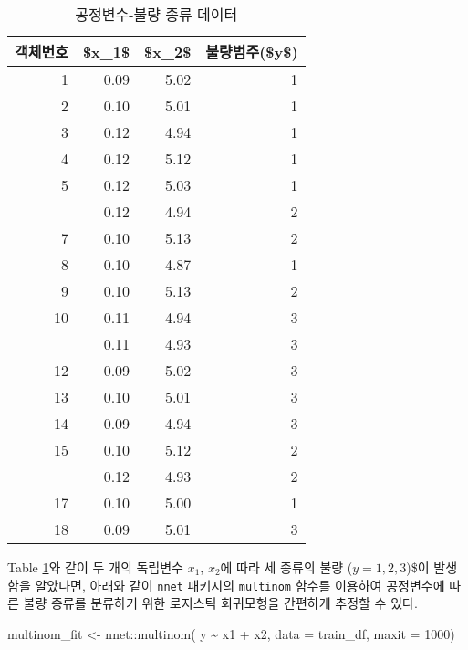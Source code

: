 \documentclass[
]{book}
\newenvironment{Shaded}{\begin{snugshade}}{\end{snugshade}}
\newcommand{\AttributeTok}[1]{\textcolor[rgb]{0.77,0.63,0.00}{#1}}
\newcommand{\DecValTok}[1]{\textcolor[rgb]{0.00,0.00,0.81}{#1}}
\newcommand{\FunctionTok}[1]{\textcolor[rgb]{0.00,0.00,0.00}{#1}}
\newcommand{\NormalTok}[1]{#1}
\newcommand{\OtherTok}[1]{\textcolor[rgb]{0.56,0.35,0.01}{#1}}
\newcommand{\SpecialCharTok}[1]{\textcolor[rgb]{0.00,0.00,0.00}{#1}}
\begin{document}
\begin{table}

\caption{\label{tab:nominal-logistic-reg-train-data}공정변수-불량 종류 데이터}
\centering
\begin{tabular}[t]{rrrr}
\toprule
객체번호 & \$x\_1\$ & \$x\_2\$ & 불량범주(\$y\$)\\
\midrule
1 & 0.09 & 5.02 & 1\\
2 & 0.10 & 5.01 & 1\\
3 & 0.12 & 4.94 & 1\\
4 & 0.12 & 5.12 & 1\\
5 & 0.12 & 5.03 & 1\\
\addlinespace
6 & 0.12 & 4.94 & 2\\
7 & 0.10 & 5.13 & 2\\
8 & 0.10 & 4.87 & 1\\
9 & 0.10 & 5.13 & 2\\
10 & 0.11 & 4.94 & 3\\
\addlinespace
11 & 0.11 & 4.93 & 3\\
12 & 0.09 & 5.02 & 3\\
13 & 0.10 & 5.01 & 3\\
14 & 0.09 & 4.94 & 3\\
15 & 0.10 & 5.12 & 2\\
\addlinespace
16 & 0.12 & 4.93 & 2\\
17 & 0.10 & 5.00 & 1\\
18 & 0.09 & 5.01 & 3\\
\bottomrule
\end{tabular}
\end{table}

Table \ref{tab:nominal-logistic-reg-train-data}와 같이 두 개의 독립변수 \(x_1\), \(x_2\)에 따라 세 종류의 불량 (\(y = 1, 2, 3\))\$이 발생함을 알았다면, 아래와 같이 \texttt{nnet} 패키지의 \texttt{multinom} 함수를 이용하여 공정변수에 따른 불량 종류를 분류하기 위한 로지스틱 회귀모형을 간편하게 추정할 수 있다.

\begin{Shaded}
\begin{Highlighting}[]
\NormalTok{multinom\_fit }\OtherTok{\textless{}{-}}\NormalTok{ nnet}\SpecialCharTok{::}\FunctionTok{multinom}\NormalTok{(}
\NormalTok{  y }\SpecialCharTok{\textasciitilde{}}\NormalTok{ x1 }\SpecialCharTok{+}\NormalTok{ x2, }
  \AttributeTok{data =}\NormalTok{ train\_df, }
  \AttributeTok{maxit =} \DecValTok{1000}\NormalTok{)}
\end{Highlighting}
\end{Shaded}
\end{document}
